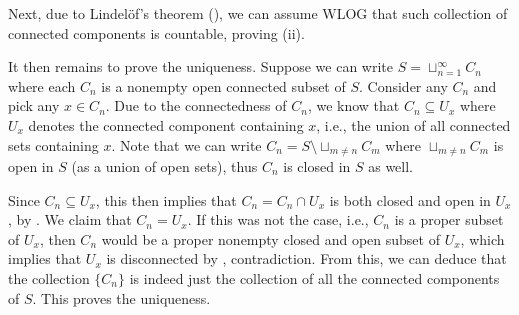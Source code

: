 \begin{enumerate}
\begin{pf}
Next, due to Lindel\"{o}f's theorem (), we can assume
WLOG that such collection of connected components is countable, proving (ii).

It then remains to prove the uniqueness. Suppose we can write
\(S=\sqcup_{n=1}^{\infty}C_n\) where each \(C_n\) is a nonempty open connected
subset of \(S\). Consider any \(C_n\) and pick any \(x\in C_n\). Due to the
connectedness of \(C_n\), we know that \(C_n\subseteq U_x\) where \(U_x\)
denotes the connected component containing \(x\), i.e., the union of all
connected sets containing \(x\). Note that we can write \(C_n=S\setminus
\sqcup_{m\ne n}C_m\) where \(\sqcup_{m\ne n}C_m\) is open in \(S\) (as a union
of open sets), thus \(C_n\) is closed in \(S\) as well.

Since \(C_n\subseteq U_x\), this then implies that \(C_n=C_n\cap U_x\) is both
closed and open in \(U_x\), by
. We claim that
\(C_n=U_x\). If this was not the case, i.e., \(C_n\) is a proper subset of
\(U_x\), then \(C_n\) would be a proper nonempty closed and open subset of
\(U_x\), which implies that \(U_x\) is disconnected by ,
contradiction. From this, we can deduce that the collection \(\{C_n\}\) is
indeed just the collection of all the connected components of \(S\). This proves the
uniqueness.
\end{pf}
\end{enumerate}
